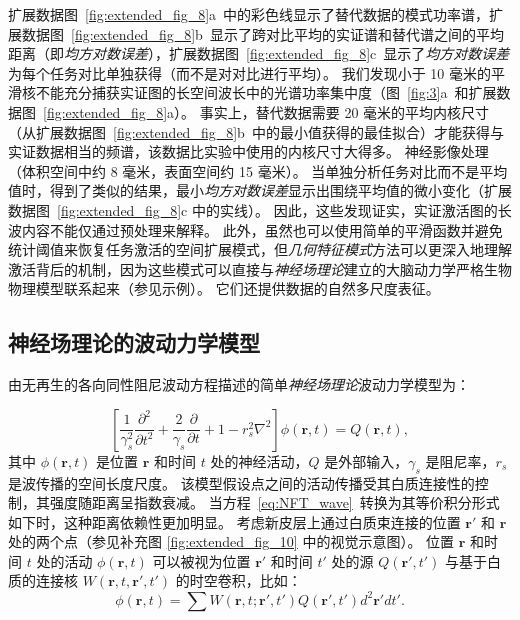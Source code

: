 \documentclass[lang=cn,a4paper,newtx,citestyle=gb7714-2015, bibstyle=gb7714-2015]{elegantpaper}
\begin{document}
扩展数据图~\ref{fig:extended_fig_8}a~中的彩色线显示了替代数据的模式功率谱，扩展数据图~\ref{fig:extended_fig_8}b~显示了跨对比平均的实证谱和替代谱之间的平均距离（即\textit{均方对数误差}），扩展数据图~\ref{fig:extended_fig_8}c~显示了\textit{均方对数误差}为每个任务对比单独获得（而不是对对比进行平均）。
我们发现小于 10 毫米的平滑核不能充分捕获实证图的长空间波长中的光谱功率集中度（图~\ref{fig:3}a~和扩展数据图~\ref{fig:extended_fig_8}a）。
事实上，替代数据需要 20 毫米的平均内核尺寸（从扩展数据图~\ref{fig:extended_fig_8}b~中的最小值获得的最佳拟合）才能获得与实证数据相当的频谱，该数据比实验中使用的内核尺寸大得多。
神经影像处理（体积空间\cite{carp2012secret}中约 8 毫米，表面空间\cite{coalson2018impact}约 15 毫米）。
当单独分析任务对比而不是平均值时，得到了类似的结果，最小\textit{均方对数误差}显示出围绕平均值的微小变化（扩展数据图~\ref{fig:extended_fig_8}c 中的实线）。
因此，这些发现证实，实证激活图的长波内容不能仅通过预处理来解释。
此外，虽然也可以使用简单的平滑函数并避免统计阈值来恢复任务激活的空间扩展模式，但\textit{几何特征模式}方法可以更深入地理解激活背后的机制，因为这些模式可以直接与\textit{神经场理论}建立的大脑动力学严格生物物理模型联系起来（参见示例\cite{robinson1997propagation,robinson2016eigenmodes,jones1999golgi,wang2016brain}）。
它们还提供数据的自然多尺度表征。



\subsection{神经场理论的波动力学模型} \label{sec:NFT_wave}

由无再生的各向同性阻尼波动方程描述的简单\textit{神经场理论}波动力学模型为：

\begin{equation}\label{eq:NFT_wave}
	[\frac{1}{\gamma_s^2} \frac{\partial ^2}{\partial t^2} +
	\frac{2}{\gamma_s} \frac{\partial}{\partial t} + 
	1 - r_s^2 \nabla^2
	]
	\phi(\boldsymbol{r}, t)
	= Q(\boldsymbol{r}, t),
\end{equation}
%
其中 $ \phi(\boldsymbol{r},t) $ 是位置 $ \boldsymbol{r} $ 和时间 $ t $ 处的神经活动，$ Q $ 是外部输入，$ \gamma_s $ 是阻尼率，$ r_s $ 是波传播的空间长度尺度。
该模型假设点之间的活动传播受其白质连接性的控制，其强度随距离呈指数衰减。
当方程~\ref{eq:NFT_wave}~转换为其等价积分形式如下时，这种距离依赖性更加明显。
考虑新皮层上通过白质束连接的位置 $ \boldsymbol{r}' $ 和 $ \boldsymbol{r} $ 处的两个点（参见补充图 \ref{fig:extended_fig_10} 中的视觉示意图）。
位置 $ \boldsymbol{r} $ 和时间 $ t $ 处的活动 $ \phi(\boldsymbol{r},t) $ 可以被视为位置 $ \boldsymbol{r}' $ 和时间 $ t' $ 处的源 $ Q(\boldsymbol{r}',t') $ 与基于白质的连接核 $ W(\boldsymbol{r}, t, \boldsymbol{r}', t') $ 的时空卷积，比如：
\begin{equation}\label{eq:location_activity}
	\phi(\boldsymbol{r}, t) = 
		\sum
			W(\boldsymbol{r}, t; \boldsymbol{r}', t')
			Q(\boldsymbol{r}', t')
			d^2
			\boldsymbol{r}'
			dt'.
\end{equation}
\end{document}
